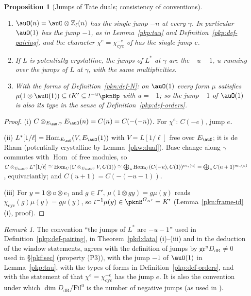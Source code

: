 \documentclass[10pt]{amsart}
\newtheorem{proposition}[theorem]{Proposition}
\theoremstyle{definition}
\theoremstyle{remark}
\newtheorem{remark}[theorem]{Remark}
\newcommand{\Z}{\mathbb Z}
\begin{document}
\begin{proposition}[Jumps of Tate duals; consistency of conventions]\label{pkw:HT}
\begin{enumerate}
\item[(i)] $\auO(n)=\auO\otimes\Z_\ell(n)$ has the single jump $-n$ at every $\gamma$. In particular $\auO(1)$ has the
jump $-1$, as in Lemma~\ref{pkp:tau} and Definition~\ref{pkp:def-pairing}, and the character $\chi^e=
\chi_{\mathrm{cyc}}^{-e}$ of {\cite[\S5]{P55}} has the single jump $e$.
\item[(ii)] If $L$ is potentially crystalline, the jumps of $L^*$ at $\gamma$ are the $-u-1$, $u$ running over the
jumps of $L$ at $\gamma$, with the same multiplicities.
\item[(iii)] With the forms of Definition~\ref{pkn:def-N}: on $\auO(1)$ every form $\mu$ satisfies
$\mu(1\otimes\auO(1))\subseteq tK'\subseteq t^{-u}\pknBp$ with $u=-1$; so the jump $-1$ of $\auO(1)$ is also its type
in the sense of Definition~\ref{pkp:def-orders}.
\end{enumerate}
\end{proposition}

\begin{proof}
(i) $C\otimes_{E_\auO,\gamma}E_\auO(n)=C(n)=C(-(-n))$. For $\chi^e$: $C(-e)$, jump $e$.

(ii) $L^*[1/\ell]=\operatorname{Hom}_{E_\auO}(V,E_\auO(1))$ with $V=L[1/\ell]$ free over $E_\auO$; it is de Rham
(potentially crystalline by Lemma~\ref{pkw:dual}). Base change along $\gamma$ commutes with $\operatorname{Hom}$ of free
modules, so $C\otimes_{E_\auO,\gamma}L^*[1/\ell]\cong\operatorname{Hom}_C(C\otimes_{E_\auO,\gamma}V,C(1))\cong
\bigoplus_u\operatorname{Hom}_C(C(-u),C(1))^{m_\gamma(u)}=\bigoplus_uC(u+1)^{m_\gamma(u)}$, equivariantly; and
$C(u+1)=C(-(-u-1))$.

(iii) For $y=1\otimes a\otimes e_1$ and $g\in\Gamma'$, $\mu(1\otimes gy)=g\mu(y)$ reads
$\chi_{\mathrm{cyc}}(g)\mu(y)=g\mu(y)$, so $t^{-1}\mu(y)\in\pknB^{G_{K'}}=K'$ (Lemma~\ref{pkn:frame-id}(i), proof).
\end{proof}

\begin{remark}
The convention ``the jumps of $L^*$ are $-u-1$'' used in
Definition~\ref{pkp:def-pairing}, in Theorem~\ref{pkd:data} (i)--(iii) and in the deduction of the window
statements, agrees with the definition of jumps by $\mathrm{gr}^uD_{\mathrm{dR}}\ne0$ used in \S\ref{pkf:sec}
(property (P3)), with the jump $-1$ of $\auO(1)$ in Lemma~\ref{pkp:tau}, with the types of forms in
Definition~\ref{pkp:def-orders}, and with the statement of {\cite[\S5]{P55}} that $\chi^e=\chi_{\mathrm{cyc}}^{-e}$ has
the jump $e$. It is also the convention under which $\dim D_{\mathrm{dR}}/\mathrm{Fil}^0$ is the number of
negative jumps (as used in {\cite[\S2]{P55}}).
\end{remark}
\end{document}
